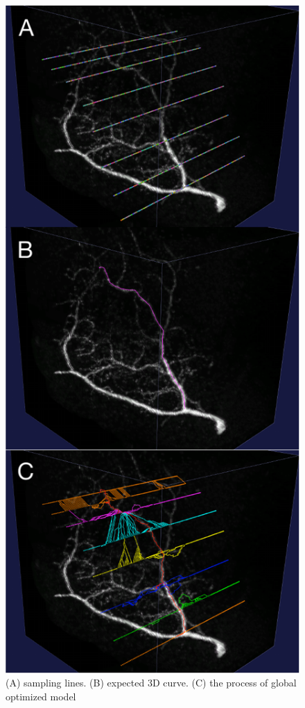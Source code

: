 \begin{figure}[htb]
\begin{center}
\includegraphics[width=6in]{images/fm_dynamic_drawing}
\caption{(A) sampling lines. (B) expected 3D curve. (C) the process of global optimized model}
\label{fig:fm-dynamic-drawing}
\end{center}
\end{figure}

